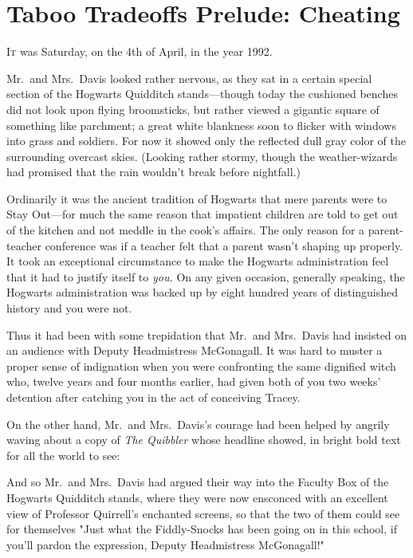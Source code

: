 \chapter{Taboo Tradeoffs Prelude: Cheating}

\lettrine{I}{t} was Saturday, 
on the 4th of April, in the year 1992.

Mr.~and Mrs.~Davis looked rather nervous, as they sat in a certain special 
section of the Hogwarts Quidditch stands---though today the cushioned benches 
did not look upon flying broomsticks, but rather viewed a gigantic square of 
something like parchment; a great white blankness soon to flicker with windows 
into grass and soldiers. For now it showed only the reflected dull gray color 
of the surrounding overcast skies. (Looking rather stormy, though the 
weather-wizards had promised that the rain wouldn't break before nightfall.)

Ordinarily it was the ancient tradition of Hogwarts that mere parents were to 
Stay Out---for much the same reason that impatient children are told to get out 
of the kitchen and not meddle in the cook's affairs. The only reason for a 
parent-teacher conference was if a teacher felt that a parent wasn't shaping up 
properly. It took an exceptional circumstance to make the Hogwarts 
administration feel that it had to justify itself to \emph{you.} On any given 
occasion, generally speaking, the Hogwarts administration was backed up by 
eight hundred years of distinguished history and you were not.

Thus it had been with some trepidation that Mr.~and Mrs.~Davis had insisted on 
an audience with Deputy Headmistress McGonagall. It was hard to muster a proper 
sense of indignation when you were confronting the same dignified witch who, 
twelve years and four months earlier, had given both of you two weeks' 
detention after catching you in the act of conceiving Tracey.

On the other hand, Mr.~and Mrs.~Davis's courage had been helped by angrily 
waving about a copy of \emph{The Quibbler} whose headline showed, in bright 
bold text for all the world to see:


And so Mr.~and Mrs.~Davis had argued their way into the Faculty Box of the 
Hogwarts Quidditch stands, where they were now ensconced with an excellent view 
of Professor Quirrell's enchanted screens, so that the two of them could see 
for themselves "Just what the Fiddly-Snocks has been going on in this school, 
if you'll pardon the expression, Deputy Headmistress McGonagall!"

